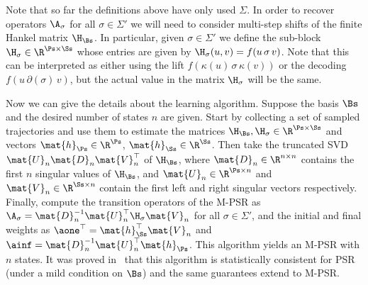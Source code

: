 Note that so far the definitions above have only used $\Sigma$. In order to recover operators $\A_\sigma$ for all $\sigma \in \Sigma'$ we will need to consider multi-step shifts of the finite Hankel matrix $\H_{\Bs}$. In particular, given $\sigma \in \Sigma'$ we define the sub-block $\H_\sigma \in \R^{\Ps \times \Ss}$ whose entries are given by $\H_\sigma(u,v) = f(u \, \sigma \, v)$. Note that this can be interpreted as either using the lift $f(\kappa(u) \, \sigma \, \kappa(v))$ or the decoding $f(u \, \partial(\sigma) \, v)$, but the actual value in the matrix $\H_\sigma$ will be the same.

Now we can give the details about the learning algorithm. Suppose the basis $\Bs$ and the desired number of states $n$ are given. Start by collecting a set of sampled trajectories and use them to estimate the matrices $\H_{\Bs}, \H_\sigma \in \R^{\Ps \times \Ss}$ and vectors $\mat{h}_{\Ps} \in \R^{\Ps}$, $\mat{h}_{\Ss} \in \R^{\Ss}$. Then take the truncated SVD $\mat{U}_n \mat{D}_n \mat{V}_n^\top$ of $\H_{\Bs}$, where $\mat{D}_n \in \R^{n \times n}$ contains the first $n$ singular values of $\H_{\Bs}$, and $\mat{U}_n \in \R^{\Ps \times n}$ and $\mat{V}_n \in \R^{\Ss \times n}$ contain the first left and right singular vectors respectively. Finally, compute the transition operators of the M-PSR as $\A_\sigma = \mat{D}_n^{-1} \mat{U}_n^\top \H_\sigma \mat{V}_n$ for all $\sigma \in \Sigma'$, and the initial and final weights as $\aone^\top = \mat{h}_{\Ss}^\top \mat{V}_n$ and $\ainf = \mat{D}_n^{-1} \mat{U}_n^\top \mat{h}_{\Ps}$.
%
This algorithm yields an M-PSR with $n$ states. It was proved in~\cite{bootspsr} that this algorithm is statistically consistent for PSR (under a mild condition on $\Bs$) and the same guarantees extend to M-PSR.

